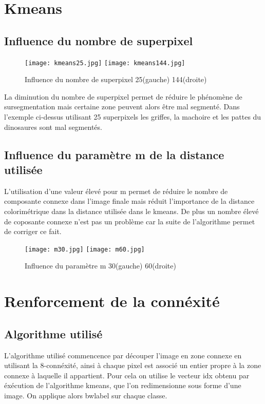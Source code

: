 \documentclass{article}
\begin{document}
\section{Kmeans}

\subsection{Influence du nombre de superpixel}

\begin{figure}[H]
\centering
\texttt{[image: kmeans25.jpg]}
\texttt{[image: kmeans144.jpg]}
\caption{Influence du nombre de superpixel 25(gauche) 144(droite)}
\end{figure}

La diminution du nombre de superpixel permet de réduire le phénomène de sursegmentation mais certaine zone peuvent alors être mal segmenté. Dans l'exemple ci-dessus utilisant 25 superpixels les griffes, la machoire et les pattes du dinosaures sont mal segmentés.

\subsection{Influence du paramètre m de la distance utilisée}

L'utilisation d'une valeur élevé pour m permet de réduire le nombre de composante connexe dans l'image finale mais réduit l'importance de la distance colorimétrique dans la distance utilisée dans le kmeans. De plus un nombre élevé de coposante connexe n'est pas un problème car la suite de l'algorithme permet de corriger ce fait.

\begin{figure}[H]
\centering
\texttt{[image: m30.jpg]}
\texttt{[image: m60.jpg]}
\caption{Influence du paramètre m 30(gauche) 60(droite)}
\end{figure}

\section{Renforcement de la connéxité}

\subsection{Algorithme utilisé}

L'algorithme utilisé commencence par découper l'image en zone connexe en utilisant la 8-connéxité, ainsi à chaque pixel est associé un entier propre à la zone connexe à laquelle il appartient. Pour cela on utilise le vecteur idx obtenu par éxécution de l'algorithme kmeans, que l'on redimensionne sous forme d'une image. On applique alors bwlabel sur chaque classe.
\end{document}
